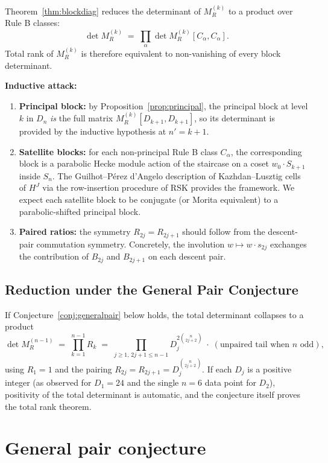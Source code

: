 \documentclass[11pt]{article}
\theoremstyle{definition}
\begin{document}
Theorem~\ref{thm:blockdiag} reduces the determinant of $M_R^{(k)}$ to a product over Rule B classes:
\[
\det M_R^{(k)} \;=\; \prod_\alpha \det M_R^{(k)}[C_\alpha, C_\alpha].
\]
Total rank of $M_R^{(k)}$ is therefore equivalent to non-vanishing of every block determinant.

\textbf{Inductive attack:}

\begin{enumerate}
\item \textbf{Principal block:} by Proposition~\ref{prop:principal}, the principal block at level $k$ in $D_n$ \emph{is} the full matrix $M_R^{(k)}[D_{k+1}, D_{k+1}]$, so its determinant is provided by the inductive hypothesis at $n' = k+1$.

\item \textbf{Satellite blocks:} for each non-principal Rule B class $C_\alpha$, the corresponding block is a parabolic Hecke module action of the staircase on a coset $w_0 \cdot S_{k+1}$ inside $S_n$. The Guilhot--P\'erez d'Angelo description of Kazhdan--Lusztig cells of $H^J$ via the row-insertion procedure of RSK provides the framework. We expect each satellite block to be conjugate (or Morita equivalent) to a parabolic-shifted principal block.

\item \textbf{Paired ratios:} the symmetry $R_{2j} = R_{2j+1}$ should follow from the descent-pair commutation symmetry. Concretely, the involution $w \mapsto w \cdot s_{2j}$ exchanges the contribution of $B_{2j}$ and $B_{2j+1}$ on each descent pair.
\end{enumerate}

\subsection*{Reduction under the General Pair Conjecture}

If Conjecture~\ref{conj:generalpair} below holds, the total determinant collapses to a product
\[
\det M_R^{(n-1)} \;=\; \prod_{k=1}^{n-1} R_k \;=\; \prod_{j \ge 1,\, 2j+1 \le n-1} D_j^{2\binom{n}{2j+2}} \;\cdot\; (\text{unpaired tail when } n \text{ odd}),
\]
using $R_1 = 1$ and the pairing $R_{2j} = R_{2j+1} = D_j^{\binom{n}{2j+2}}$. If each $D_j$ is a positive integer (as observed for $D_1 = 24$ and the single $n = 6$ data point for $D_2$), positivity of the total determinant is automatic, and the conjecture itself proves the total rank theorem.

\section{General pair conjecture}
\end{document}
